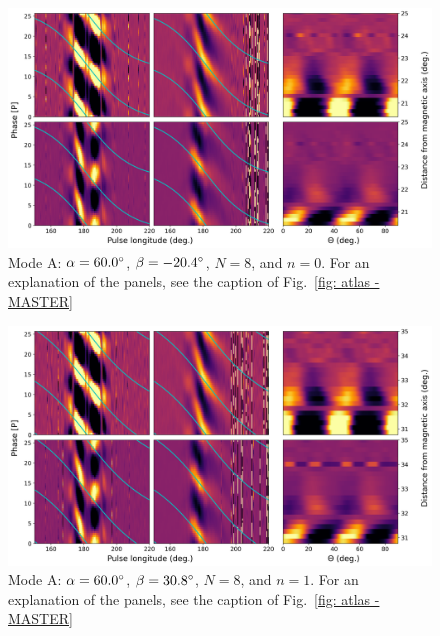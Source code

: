 \begin{figure}
	\begin{center}
		\includegraphics[width=\atlasHeightFrac\textwidth]{Figures/B0031/atlas/A_517060008000_plots}
		\caption[Atlas results: Mode A -- $\alpha=60.0\degr$, $\beta=-20.4\degr$, $N=8$, $n=0$]{Mode A: $\alpha=60.0\degr$, $\beta=-20.4\degr$, $N=8$, and $n=0$. For an explanation of the panels, see the caption of Fig.~\ref{fig: atlas - MASTER} }
		\label{fig: atlas - A_517060008000}
	\end{center}
\end{figure}

\begin{figure}
	\begin{center}
		\includegraphics[width=\atlasHeightFrac\textwidth]{Figures/B0031/atlas/A_517060008001_plots}
		\caption[Atlas results: Mode A -- $\alpha=60.0\degr$, $\beta=30.8\degr$, $N=8$, $n=1$]{Mode A: $\alpha=60.0\degr$, $\beta=30.8\degr$, $N=8$, and $n=1$. For an explanation of the panels, see the caption of Fig.~\ref{fig: atlas - MASTER} }
		\label{fig: atlas - A_517060008001}
	\end{center}
\end{figure}

